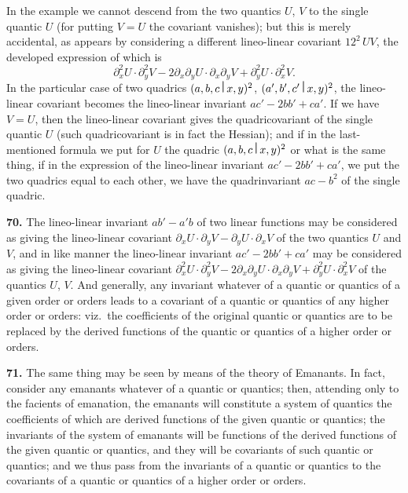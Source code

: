 \documentclass[11pt,a4paper]{book}
\begin{document}
\begin{center}
In the example we cannot descend from the two quantics $U$, $V$ to the single quantic $U$ (for putting $V=U$ the covariant vanishes); but this is merely accidental, as appears by considering a different lineo-linear covariant $12^2\,UV$, the developed expression of which is
\[\partial_x^2 U \cdot \partial_y^2 V - 2\partial_x\partial_y U \cdot \partial_x\partial_y V + \partial_y^2 U \cdot \partial_x^2 V.\]
In the particular case of two quadrics $(a,b,c\,\raisebox{0.5ex}{\textbf{\textbar}}\,x,y)^2$, $(a',b',c'\,\raisebox{0.5ex}{\textbf{\textbar}}\,x,y)^2$, the lineo-linear covariant becomes the lineo-linear invariant $ac'-2bb'+ca'$. If we have $V=U$, then the lineo-linear covariant gives the quadricovariant of the single quantic $U$ (such quadricovariant is in fact the Hessian); and if in the last-mentioned formula we put for $U$ the quadric $(a,b,c\,\raisebox{0.5ex}{\textbf{\textbar}}\,x,y)^2$ or what is the same thing, if in the expression of the lineo-linear invariant $ac'-2bb'+ca'$, we put the two quadrics equal to each other, we have the quadrinvariant $ac-b^2$ of the single quadric.

\medskip
\noindent\textbf{70.} The lineo-linear invariant $ab'-a'b$ of two linear functions may be considered as giving the lineo-linear covariant $\partial_x U \cdot \partial_y V - \partial_y U \cdot \partial_x V$ of the two quantics $U$ and $V$, and in like manner the lineo-linear invariant $ac'-2bb'+ca'$ may be considered as giving the lineo-linear covariant $\partial_x^2 U \cdot \partial_y^2 V - 2\partial_x\partial_y U \cdot \partial_x\partial_y V + \partial_y^2 U \cdot \partial_x^2 V$ of the quantics $U$, $V$. And generally, any invariant whatever of a quantic or quantics of a given order or orders leads to a covariant of a quantic or quantics of any higher order or orders: viz.\ the coefficients of the original quantic or quantics are to be replaced by the derived functions of the quantic or quantics of a higher order or orders.

\medskip
\noindent\textbf{71.} The same thing may be seen by means of the theory of Emanants. In fact, consider any emanants whatever of a quantic or quantics; then, attending only to the facients of emanation, the emanants will constitute a system of quantics the coefficients of which are derived functions of the given quantic or quantics; the invariants of the system of emanants will be functions of the derived functions of the given quantic or quantics, and they will be covariants of such quantic or quantics; and we thus pass from the invariants of a quantic or quantics to the covariants of a quantic or quantics of a higher order or orders.


\end{center}
\end{document}
